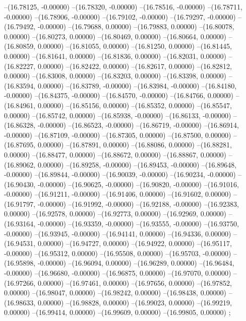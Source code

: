 --(16.78125, -0.00000)
--(16.78320, -0.00000)
--(16.78516, -0.00000)
--(16.78711, -0.00000)
--(16.78906, -0.00000)
--(16.79102, -0.00000)
--(16.79297, -0.00000)
--(16.79492, -0.00000)
--(16.79688, 0.00000)
--(16.79883, 0.00000)
--(16.80078, 0.00000)
--(16.80273, 0.00000)
--(16.80469, 0.00000)
--(16.80664, 0.00000)
--(16.80859, 0.00000)
--(16.81055, 0.00000)
--(16.81250, 0.00000)
--(16.81445, 0.00000)
--(16.81641, 0.00000)
--(16.81836, 0.00000)
--(16.82031, 0.00000)
--(16.82227, 0.00000)
--(16.82422, 0.00000)
--(16.82617, 0.00000)
--(16.82812, 0.00000)
--(16.83008, 0.00000)
--(16.83203, 0.00000)
--(16.83398, 0.00000)
--(16.83594, 0.00000)
--(16.83789, -0.00000)
--(16.83984, -0.00000)
--(16.84180, -0.00000)
--(16.84375, -0.00000)
--(16.84570, -0.00000)
--(16.84766, 0.00000)
--(16.84961, 0.00000)
--(16.85156, 0.00000)
--(16.85352, 0.00000)
--(16.85547, 0.00000)
--(16.85742, 0.00000)
--(16.85938, -0.00000)
--(16.86133, -0.00000)
--(16.86328, -0.00000)
--(16.86523, -0.00000)
--(16.86719, -0.00000)
--(16.86914, -0.00000)
--(16.87109, -0.00000)
--(16.87305, 0.00000)
--(16.87500, 0.00000)
--(16.87695, 0.00000)
--(16.87891, 0.00000)
--(16.88086, 0.00000)
--(16.88281, 0.00000)
--(16.88477, 0.00000)
--(16.88672, 0.00000)
--(16.88867, 0.00000)
--(16.89062, 0.00000)
--(16.89258, -0.00000)
--(16.89453, -0.00000)
--(16.89648, -0.00000)
--(16.89844, -0.00000)
--(16.90039, -0.00000)
--(16.90234, -0.00000)
--(16.90430, -0.00000)
--(16.90625, -0.00000)
--(16.90820, -0.00000)
--(16.91016, -0.00000)
--(16.91211, -0.00000)
--(16.91406, 0.00000)
--(16.91602, 0.00000)
--(16.91797, -0.00000)
--(16.91992, -0.00000)
--(16.92188, -0.00000)
--(16.92383, 0.00000)
--(16.92578, 0.00000)
--(16.92773, 0.00000)
--(16.92969, 0.00000)
--(16.93164, -0.00000)
--(16.93359, -0.00000)
--(16.93555, -0.00000)
--(16.93750, -0.00000)
--(16.93945, -0.00000)
--(16.94141, 0.00000)
--(16.94336, 0.00000)
--(16.94531, 0.00000)
--(16.94727, 0.00000)
--(16.94922, 0.00000)
--(16.95117, -0.00000)
--(16.95312, 0.00000)
--(16.95508, 0.00000)
--(16.95703, -0.00000)
--(16.95898, -0.00000)
--(16.96094, 0.00000)
--(16.96289, 0.00000)
--(16.96484, -0.00000)
--(16.96680, -0.00000)
--(16.96875, 0.00000)
--(16.97070, 0.00000)
--(16.97266, 0.00000)
--(16.97461, 0.00000)
--(16.97656, 0.00000)
--(16.97852, 0.00000)
--(16.98047, 0.00000)
--(16.98242, 0.00000)
--(16.98438, 0.00000)
--(16.98633, 0.00000)
--(16.98828, 0.00000)
--(16.99023, 0.00000)
--(16.99219, 0.00000)
--(16.99414, 0.00000)
--(16.99609, 0.00000)
--(16.99805, 0.00000)
;
